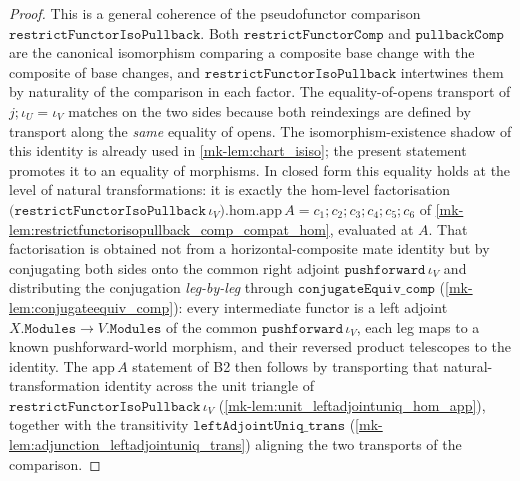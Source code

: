 \begin{proof}
  \leanok
  This is a general coherence of the pseudofunctor comparison
  \(\mathtt{restrictFunctorIsoPullback}\). Both \(\mathtt{restrictFunctorComp}\) and
  \(\mathtt{pullbackComp}\) are the canonical isomorphism comparing a composite base change with the
  composite of base changes, and \(\mathtt{restrictFunctorIsoPullback}\) intertwines them by
  naturality of the comparison in each factor. The equality-of-opens transport of
  \(j \mathbin{;} \iota_U = \iota_V\) matches on the two sides because both reindexings are defined by
  transport along the \emph{same} equality of opens. The isomorphism-existence shadow of this
  identity is already used in \ref{mk-lem:chart_isiso}; the present statement promotes it to an
  equality of morphisms. In closed form this equality holds at the level of natural transformations:
  it is exactly the hom-level factorisation
  \(\bigl(\mathtt{restrictFunctorIsoPullback}\,\iota_V\bigr).\mathrm{hom}.\mathrm{app}\,A
  = c_1 \mathbin{;} c_2 \mathbin{;} c_3 \mathbin{;} c_4 \mathbin{;} c_5 \mathbin{;} c_6\) of
  \ref{mk-lem:restrictfunctorisopullback_comp_compat_hom}, evaluated at \(A\). That factorisation is
  obtained not from a horizontal-composite mate identity but by conjugating both sides onto the
  common right adjoint \(\mathtt{pushforward}\,\iota_V\) and distributing the conjugation
  \emph{leg-by-leg} through \(\mathtt{conjugateEquiv\_comp}\) (\ref{mk-lem:conjugateequiv_comp}): every
  intermediate functor is a left adjoint \(X.\mathtt{Modules} \to V.\mathtt{Modules}\) of the common
  \(\mathtt{pushforward}\,\iota_V\), each leg maps to a known pushforward-world morphism, and their
  reversed product telescopes to the identity. The \(\mathrm{app}\,A\) statement of B2 then follows
  by transporting that natural-transformation identity across the unit triangle of
  \(\mathtt{restrictFunctorIsoPullback}\,\iota_V\) (\ref{mk-lem:unit_leftadjointuniq_hom_app}),
  together with the transitivity \(\mathtt{leftAdjointUniq\_trans}\)
  (\ref{mk-lem:adjunction_leftadjointuniq_trans}) aligning the two transports of the comparison.
\end{proof}
